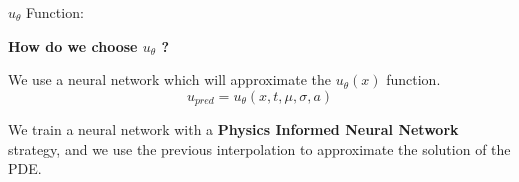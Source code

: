 \begin{frame}{$u_{\theta}$ Function:}

    \textbf{How do we choose $u_{\theta}$ ?}
    
    We use a neural network which will approximate the $u_\theta(x)$ function. 
    $$
    u_{pred} = u_{\theta}(x ,t, \mu, \sigma, a)
    $$

    We train a neural network with a \textbf{Physics Informed Neural Network} strategy, and we use the previous interpolation to approximate
    the solution of the PDE.

\end{frame}
